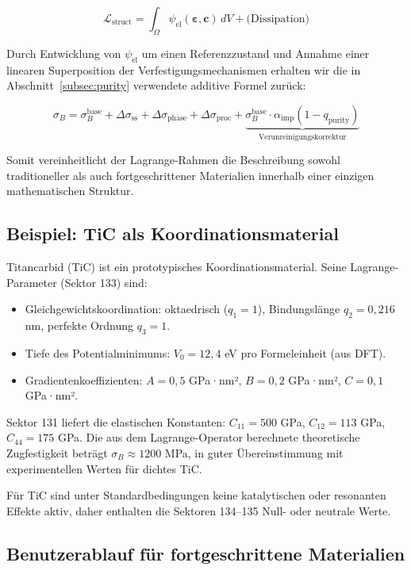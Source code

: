 \documentclass[12pt,a4paper]{article}
\begin{document}
\[
\mathcal{L}_{\mathrm{struct}} = \int_{\Omega} \psi_{\mathrm{el}}(\boldsymbol{\varepsilon}, \mathbf{c}) \, dV + \text{(Dissipation)}
\]

Durch Entwicklung von \(\psi_{\mathrm{el}}\) um einen Referenzzustand und Annahme einer linearen Superposition der Verfestigungsmechanismen erhalten wir die in Abschnitt~\ref{subsec:purity} verwendete additive Formel zurück:

\[
\sigma_B = \sigma_B^{\mathrm{base}} + \Delta\sigma_{\mathrm{ss}} + \Delta\sigma_{\mathrm{phase}} + \Delta\sigma_{\mathrm{proc}} + \underbrace{\sigma_B^{\mathrm{base}} \cdot \alpha_{\mathrm{imp}} (1 - q_{\mathrm{purity}})}_{\text{Verunreinigungskorrektur}}
\]

Somit vereinheitlicht der Lagrange-Rahmen die Beschreibung sowohl traditioneller als auch fortgeschrittener Materialien innerhalb einer einzigen mathematischen Struktur.

\subsection{Beispiel: TiC als Koordinationsmaterial}
\label{subsec:example-tic}

Titancarbid (TiC) ist ein prototypisches Koordinationsmaterial. Seine Lagrange-Parameter (Sektor 133) sind:

\begin{itemize}
\item Gleichgewichtskoordination: oktaedrisch (\(q_1=1\)), Bindungslänge \(q_2 = 0,216\) nm, perfekte Ordnung \(q_3=1\).
\item Tiefe des Potentialminimums: \(V_0 = 12,4\) eV pro Formeleinheit (aus DFT).
\item Gradientenkoeffizienten: \(A=0,5\) GPa·nm², \(B=0,2\) GPa·nm², \(C=0,1\) GPa·nm².
\end{itemize}

Sektor 131 liefert die elastischen Konstanten: \(C_{11}=500\) GPa, \(C_{12}=113\) GPa, \(C_{44}=175\) GPa. Die aus dem Lagrange-Operator berechnete theoretische Zugfestigkeit beträgt \(\sigma_B \approx 1200\) MPa, in guter Übereinstimmung mit experimentellen Werten für dichtes TiC.

Für TiC sind unter Standardbedingungen keine katalytischen oder resonanten Effekte aktiv, daher enthalten die Sektoren 134–135 Null- oder neutrale Werte.

\subsection{Benutzerablauf für fortgeschrittene Materialien}
\label{subsec:workflow}
\end{document}
